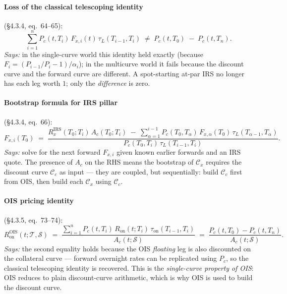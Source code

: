 \documentclass[11pt,a4paper]{article}
\begin{document}
\paragraph{Loss of the classical telescoping identity} (\S4.3.4, eq.~64--65):
\begin{equation}\label{eq:mc-no-telescope}
  \sum_{i=1}^{n} P_c(t, T_i)\, F_{x,i}(t)\, \tau_L(T_{i-1}, T_i)
  \;\ne\; P_c(t, T_0) \;-\; P_c(t, T_n).
\end{equation}
\textit{Says:} in the single-curve world this identity held
exactly (because $F_i = (P_{i-1}/P_i - 1)/\alpha_i$); in the
multicurve world it fails because the discount curve and the
forward curve are different. A spot-starting at-par IRS no longer has
each leg worth $1$; only the \emph{difference} is zero.

\paragraph{Bootstrap formula for IRS pillar} (\S4.3.4, eq.~66):
\begin{equation}\label{eq:mc-irs-boot}
  F_{x,i}(T_0)
  \;=\; \frac{R^{\text{IRS}}_x(T_0; T_i)\, A_c(T_0; T_i) \;-\; \sum_{\alpha=1}^{i-1} P_c(T_0, T_\alpha)\, F_{x,\alpha}(T_0)\, \tau_L(T_{\alpha-1}, T_\alpha)}
              {P_c(T_0, T_i)\, \tau_L(T_{i-1}, T_i)}.
\end{equation}
\textit{Says:} solve for the next forward $F_{x,i}$ given known
earlier forwards and an IRS quote. The presence of $A_c$ on the
RHS means the bootstrap of $\mathcal{C}_x$ requires the
discount curve $\mathcal{C}_c$ as input --- they are coupled, but
sequentially: build $\mathcal{C}_c$ first from OIS, then build each
$\mathcal{C}_x$ using $\mathcal{C}_c$.

\paragraph{OIS pricing identity} (\S4.3.5, eq.~73--74):
\begin{equation}\label{eq:mc-ois}
  R^{\text{OIS}}_{\text{on}}(t; \mathcal{T}, \mathcal{S})
  \;=\; \frac{\sum_{i=1}^{n} P_c(t, T_i)\, R_{\text{on}}(t; T_i)\, \tau_{\text{on}}(T_{i-1}, T_i)}{A_c(t; \mathcal{S})}
  \;=\; \frac{P_c(t, T_0) - P_c(t, T_n)}{A_c(t; \mathcal{S})}.
\end{equation}
\textit{Says:} the second equality holds because the OIS
\emph{floating} leg is also discounted on the collateral curve ---
forward overnight rates can be replicated using $P_c$, so the
classical telescoping identity is recovered. This is the
\emph{single-curve property of OIS}: OIS reduces to plain
discount-curve arithmetic, which is why OIS is used to build the
discount curve.
\end{document}
